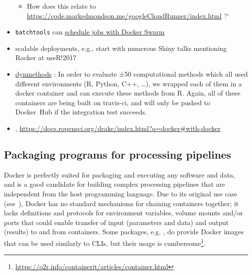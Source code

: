 \begin{itemize}
  \begin{itemize}
  \tightlist
  \item
    How does this relate to
    \url{https://code.markedmondson.me/googleCloudRunner/index.html} ?`
  \end{itemize}
\item
  \texttt{batchtools} \citep{Lang2017batchtools} can
  \href{https://mllg.github.io/batchtools/reference/makeClusterFunctionsDocker.html}{schedule
  jobs with Docker Swarm}
\item
  scalable deployments, e.g., start with numerous Shiny talks mentioning
  Rocker at useR!2017
\item
  \href{https://github.com/dynverse/dynmethods}{dynmethods}
  \citep{rcannood}: In order to evaluate ±50 computational methods which
  all used different environments (R, Python, C++, \ldots{}), we wrapped
  each of them in a docker container and can execute these methods from
  R. Again, all of these containers are being built on travis-ci, and
  will only be pushed to Docker~Hub if the integration test succeeds.
\item
  ,
  \url{https://docs.ropensci.org/drake/index.html?q=docker\#with-docker}
\end{itemize}

\hypertarget{packaging-programs-for-processing-pipelines}{%
\subsection{Packaging programs for processing
pipelines}\label{packaging-programs-for-processing-pipelines}}

\label{packaging}

Docker is perfectly suited for packaging and executing any software and
data, and is a good candidate for building complex processing pipelines
that are independent from the host programming language. Due to its
original use case (see~), Docker has no standard
mechanisms for chaining containers together; it lacks definitions and
protocols for environment variables, volume mounts and/or ports that
could enable transfer of input (parameters and data) and output
(results) to and from containers. Some packages, e.g. ,
do provide Docker images that can be used similarly to CLIs, but their
usage is
cumbersome\footnote{\href{https://o2r.info/containerit/articles/container.html}{https://o2r.info/containerit/articles/container.html}}.

